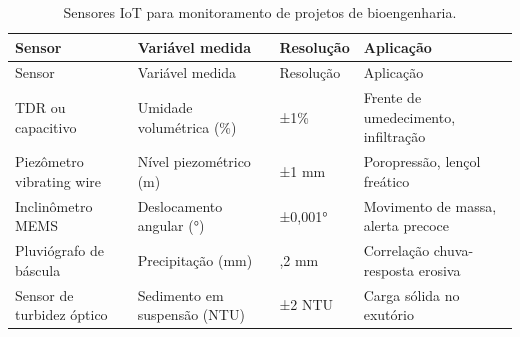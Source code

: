 \documentclass[
  portuguese,
  11pt,
  a4paper,
  open=any]{scrbook}
\begin{document}
\begin{longtable}[]{@{}
  >{\raggedright\arraybackslash}p{}
  >{\raggedright\arraybackslash}p{}
  >{\raggedright\arraybackslash}p{}
  >{\raggedright\arraybackslash}p{}@{}}
\caption{Sensores IoT para monitoramento de projetos de
bioengenharia.}\label{tbl-iot}\tabularnewline
\toprule\noalign{}
\begin{minipage}[b]{\linewidth}\raggedright
Sensor
\end{minipage} & \begin{minipage}[b]{\linewidth}\raggedright
Variável medida
\end{minipage} & \begin{minipage}[b]{\linewidth}\raggedright
Resolução
\end{minipage} & \begin{minipage}[b]{\linewidth}\raggedright
Aplicação
\end{minipage} \\
\midrule\noalign{}
\endfirsthead
\toprule\noalign{}
\begin{minipage}[b]{\linewidth}\raggedright
Sensor
\end{minipage} & \begin{minipage}[b]{\linewidth}\raggedright
Variável medida
\end{minipage} & \begin{minipage}[b]{\linewidth}\raggedright
Resolução
\end{minipage} & \begin{minipage}[b]{\linewidth}\raggedright
Aplicação
\end{minipage} \\
\midrule\noalign{}
\endhead
\bottomrule\noalign{}
\endlastfoot
TDR ou capacitivo & Umidade volumétrica (\%) & ±1\% & Frente de
umedecimento, infiltração \\
Piezômetro vibrating wire & Nível piezométrico (m) & ±1 mm &
Poropressão, lençol freático \\
Inclinômetro MEMS & Deslocamento angular (°) & ±0,001° & Movimento de
massa, alerta precoce \\
Pluviógrafo de báscula & Precipitação (mm) & 0,2 mm & Correlação
chuva-resposta erosiva \\
Sensor de turbidez óptico & Sedimento em suspensão (NTU) & ±2 NTU &
Carga sólida no exutório \\
\end{longtable}
\end{document}
